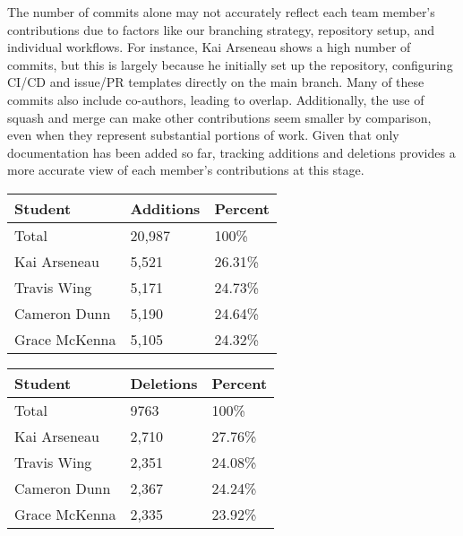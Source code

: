 \documentclass{article}
\begin{document}
The number of commits alone may not accurately reflect each team member’s contributions due to factors like our branching strategy, repository setup, and individual workflows. For instance, Kai Arseneau shows a high number of commits, but this is largely because he initially set up the repository, configuring CI/CD and issue/PR templates directly on the main branch. Many of these commits also include co-authors, leading to overlap. Additionally, the use of squash and merge can make other contributions seem smaller by comparison, even when they represent substantial portions of work. Given that only documentation has been added so far, tracking additions and deletions provides a more accurate view of each member's contributions at this stage.
\begin{table}[H]
  \centering
  \begin{tabular}{lll}
  \toprule
  \textbf{Student} & \textbf{Additions} & \textbf{Percent}\\
  \midrule
  Total & 20,987 & 100\% \\
  Kai Arseneau & 5,521 & 26.31\% \\
  Travis Wing & 5,171 & 24.73\% \\
  Cameron Dunn & 5,190 & 24.64\% \\
  Grace McKenna & 5,105 & 24.32\% \\
  \bottomrule
  \end{tabular}
\end{table}

\begin{table}[H]
  \centering
  \begin{tabular}{lll}
  \toprule
  \textbf{Student} & \textbf{Deletions} & \textbf{Percent}\\
  \midrule
  Total & 9763 & 100\% \\
  Kai Arseneau & 2,710 & 27.76\% \\
  Travis Wing & 2,351 & 24.08\% \\
  Cameron Dunn & 2,367 & 24.24\% \\
  Grace McKenna & 2,335 & 23.92\% \\
  \bottomrule
  \end{tabular}
\end{table}

\end{document}
